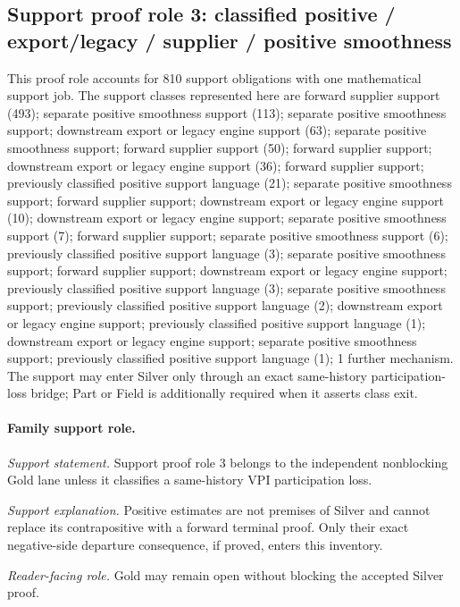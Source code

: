 \subsection{Support proof role 3: classified positive / export/legacy / supplier / positive smoothness}
This proof role accounts for 810 support obligations with one mathematical support job. The support classes represented here are forward supplier support (493); separate positive smoothness support (113); separate positive smoothness support; downstream export or legacy engine support (63); separate positive smoothness support; forward supplier support (50); forward supplier support; downstream export or legacy engine support (36); forward supplier support; previously classified positive support language (21); separate positive smoothness support; forward supplier support; downstream export or legacy engine support (10); downstream export or legacy engine support; separate positive smoothness support (7); forward supplier support; separate positive smoothness support (6); previously classified positive support language (3); separate positive smoothness support; forward supplier support; downstream export or legacy engine support; previously classified positive support language (3); separate positive smoothness support; previously classified positive support language (2); downstream export or legacy engine support; previously classified positive support language (1); downstream export or legacy engine support; separate positive smoothness support; previously classified positive support language (1); 1 further mechanism. The support may enter Silver only through an exact same-history participation-loss bridge; Part or Field is additionally required when it asserts class exit.

\paragraph{Family support role.}
\emph{Support statement.} Support proof role 3 belongs to the independent nonblocking Gold lane unless it classifies a same-history VPI participation loss.

\emph{Support explanation.} Positive estimates are not premises of Silver and cannot replace its contrapositive with a forward terminal proof. Only their exact negative-side departure consequence, if proved, enters this inventory.

\emph{Reader-facing role.} Gold may remain open without blocking the accepted Silver proof.

